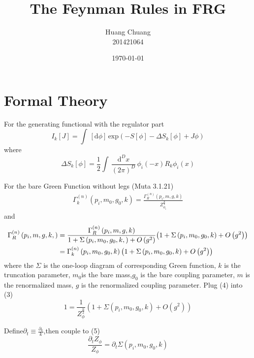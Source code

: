 \documentclass[UTF8]{ctexart}
\title{The Feynman Rules in FRG}
\author{Huang Chuang\\201421064}
\date{\today}
\begin{document}
\maketitle
\setcounter{page}{0}
\thispagestyle{empty}
\newpage
\tableofcontents
\newpage
\section{Formal Theory}
For the generating functional with the regulator part
\begin{equation}
I_k\left[J\right]=\int\,\left[\mathrm{d}{\phi}\right]\,\mathrm{exp}\left(-S\left[\phi\right]-\Delta{S_k}\left[\phi\right]+J{\phi}\right)
\end{equation}
where
\begin{equation}
\Delta{S_k}\left[\phi\right]={\frac{1}{2}}\int\,\frac{{\mathrm{d}^D}x}{{\left(2\pi\right)}^D}\,{\phi_i\left(-x\right)}R_{k}{\phi_i\left(x\right)}
\end{equation}
\par For the bare Green Function without legs (Muta 3.1.21)
\begin{align}
\Gamma_{k}^{\left(n\right)}\left(p_i,m_0,g_0,k\right)={\frac{\Gamma_{R}^{\left(n\right)}\left(p_i,m,g,k\right)}{Z_{\phi_i}^{\frac n 2}}}
\end{align}
and
\begin{align}
\Gamma_{R}^{\left(n\right)}\left(p_i,m,g,k,\right)&={\frac{\Gamma_{R}^{\left(n\right)}\left(p_i,m,g,k\right)}
{1+\Sigma\left(p_i,m_0,g_0,k,\right)+O\left(g^2\right)}}{\left(1+\Sigma\left(p_i,m_0,g_0,k\right)+O\left(g^2\right)\right)}
\notag\\&=\Gamma_{k}^{\left(n\right)}\left(p_i,m_0,g_0,k\right){\left(1+\Sigma\left(p_i,m_0,g_0,k\right)+O\left(g^2\right)\right)}
\end{align}
where the $\Sigma$ is the one-loop diagram of corresponding Green function, $k$ is the truncation parameter, $m_0 $is the bare mass,$g_0$ is the bare coupling parameter, $m$ is the renormalized mass, $g$ is the renormalized coupling parameter. Plug (4) into (3)
\begin{equation}
1={\frac 1 {Z_{\phi}^{\frac n 2}}}{\left(1+\Sigma\left(p_i,m_0,g_0,k\right)+O\left(g^2\right)\right)}
\end{equation}
\par Define$\partial_t\equiv\frac{\partial_k}k$,then couple to (5)
\begin{equation}
\frac{\partial_{t}Z_{\phi}}{Z_{\phi}}=\partial_t{\Sigma}\left(p_i,m_0,g_0,k\right)
\end{equation}
\end{document}
